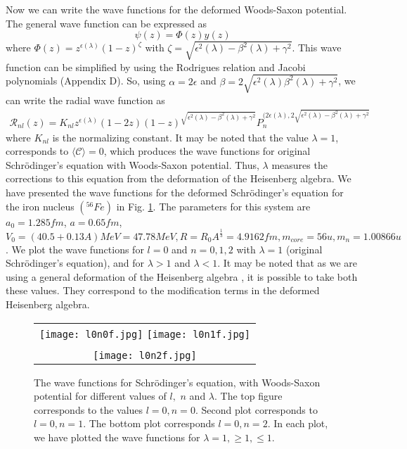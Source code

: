 \documentclass[12pt]{article}
\begin{document}
Now we can write the   wave functions for the  deformed   Woods-Saxon  potential. The general wave function can be expressed as 
\begin{equation}
\psi(z)=\Phi(z)y(z)  \label{w10} 
\end{equation}
where $\Phi(z)=z^{\epsilon(\lambda)}(1-z)^{\zeta}$ with 
$\zeta = \sqrt{\epsilon^2(\lambda)-\beta^2(\lambda)+\gamma^2}$. 
This wave function can be simplified by using the  Rodrigues relation and Jacobi polynomials  (Appendix D). So, using  
$\alpha = 2\epsilon $ and $\beta = 2\sqrt{\epsilon^2(\lambda)\beta^2(\lambda)+\gamma^2} $, we can write the radial wave function  as 
\begin{eqnarray} \label{Rnl_last}
	\mathcal{R}_{nl}(z)=K_{nl}z^{\epsilon(\lambda)}(1-2z)(1-z)^{\sqrt{\epsilon^2(\lambda)-\beta^2(\lambda)+\gamma^2}} P_n^{(2\epsilon(\lambda),2\sqrt{\epsilon^2(\lambda)-\beta^2(\lambda)+\gamma^2}}
\end{eqnarray}
where  $K_{nl}$ is the normalizing constant. 
It may be noted  that the value    $\lambda=1$, corresponds to   $\mathcal{\langle C\rangle}=0$, which produces the    wave functions for  original  Schr\"{o}dinger's equation    with Woods-Saxon  potential. Thus,  $\lambda$  measures the corrections to this equation from the deformation of the Heisenberg algebra. 
We have presented the wave functions for the deformed   Schr\"{o}dinger's equation for the iron nucleus $(^{56}Fe)$ in  Fig. \ref{fig_wavefn}.
The parameters for this system are $a_0=1.285 fm$,  $a=0.65 fm$, $V_0=(40.5+0.13A) MeV =47.78 MeV, R=R_0A^\frac{1}{3}=4.9162 fm, m_{core}=56u,m_n=1.00866u$. We plot the wave functions for $l=0$ and $n=0,1,2$ with $\lambda =1$ (original  Schr\"{o}dinger's equation), and for  $\lambda>1$ and $\lambda<1$. It may be noted that as we are using a general deformation of the Heisenberg algebra  \cite{line12, line14,bb1,bb2,bb3,bb4,bb5,bb6,bb7, line16, line18}, it is possible to take both these values. They correspond to the modification terms in the deformed Heisenberg algebra. 


\begin{figure}
\begin{tabular}{c}
\texttt{[image: l0n0f.jpg]} \hspace*{.2cm}\texttt{[image: l0n1f.jpg]}\\ \\
\texttt{[image: l0n2f.jpg]} 
\end{tabular}
	\caption{The wave functions for Schr\"{o}dinger's equation,    with Woods-Saxon potential for different values of $l,$ $n$ and $\lambda$. The top figure corresponds to the values $l=0,n=0$.  Second plot corresponds to $l=0,n=1$. The bottom plot corresponds $l=0,n=2$. In each plot, we have plotted the wave functions for $\lambda =1,\geq 1, \leq 1$.}\label{fig_wavefn}
\end{figure}
\end{document}
